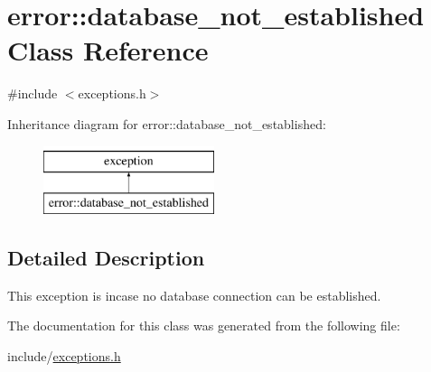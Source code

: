 \hypertarget{classerror_1_1database__not__established}{}\section{error\+:\+:database\+\_\+not\+\_\+established Class Reference}
\label{classerror_1_1database__not__established}


{\ttfamily \#include $<$exceptions.\+h$>$}

Inheritance diagram for error\+:\+:database\+\_\+not\+\_\+established\+:\begin{figure}[H]
\begin{center}
\leavevmode
\includegraphics[height=2.000000cm]{classerror_1_1database__not__established}
\end{center}
\end{figure}


\subsection{Detailed Description}
This exception is incase no database \textquotesingle{}connection\textquotesingle{} can be established. 

The documentation for this class was generated from the following file\+:\begin{DoxyCompactItemize}
\item 
include/\mbox{\hyperlink{exceptions_8h}{exceptions.\+h}}\end{DoxyCompactItemize}
